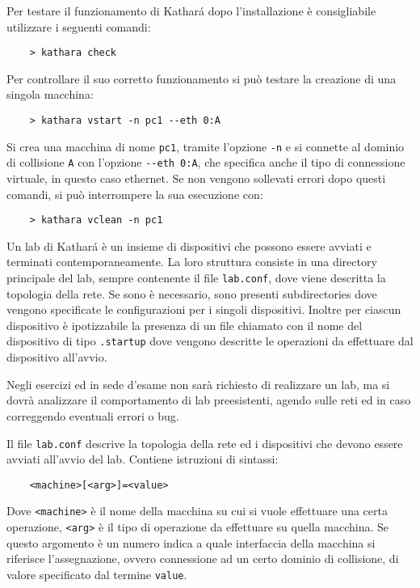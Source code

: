 \documentclass{article}
\numberwithin{equation}{subsection}
\begin{document}
Per testare il funzionamento di Kathar\'{a} dopo l'installazione è consigliabile utilizzare i seguenti comandi:
\begin{verbatim}
    > kathara check 
\end{verbatim}                                                                                                                                                                                 
Per controllare il suo corretto funzionamento si può testare la creazione di una singola macchina:
\begin{verbatim}
    > kathara vstart -n pc1 --eth 0:A
\end{verbatim}
Si crea una macchina di nome \verb|pc1|, tramite l'opzione \verb|-n| e si connette al dominio di collisione \verb|A| con l'opzione \verb|--eth 0:A|, che specifica anche il tipo di connessione virtuale, in questo 
caso ethernet. Se non vengono sollevati errori dopo questi comandi, si può interrompere la sua esecuzione con:
\begin{verbatim}
    > kathara vclean -n pc1
\end{verbatim}


Un lab di Kathar\'{a} è un insieme di dispositivi che possono essere avviati e terminati contemporaneamente. La loro struttura consiste in una directory principale del lab, sempre contenente il file \verb|lab.conf|, 
dove viene descritta la topologia della rete. Se sono è necessario, sono presenti subdirectories dove vengono specificate le configurazioni per i singoli dispositivi. Inoltre per ciascun dispositivo è 
ipotizzabile la presenza di un file chiamato con il nome del dispositivo di tipo \verb|.startup| dove vengono descritte le operazioni da effettuare dal dispositivo all'avvio. 

Negli esercizi ed in sede d'esame non sarà richiesto di realizzare un lab, ma si dovrà analizzare il comportamento di lab preesistenti, agendo sulle reti ed in caso correggendo eventuali errori o bug. 


Il file \verb|lab.conf| descrive la topologia della rete ed i dispositivi che devono essere avviati all'avvio del lab. Contiene istruzioni di sintassi:
\begin{verbatim}
    <machine>[<arg>]=<value>
\end{verbatim}
Dove \verb|<machine>| è il nome della macchina su cui si vuole effettuare una certa operazione, \verb|<arg>| è il tipo di operazione da effettuare su quella macchina. Se questo argomento è un numero indica a quale 
interfaccia della macchina si riferisce l'assegnazione, ovvero connessione ad un certo dominio di collisione, di valore specificato dal termine \verb|value|. 
\end{document}
